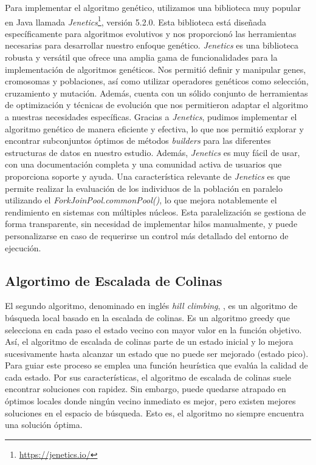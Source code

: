 Para implementar el algoritmo genético, utilizamos una biblioteca muy popular en Java llamada \emph{Jenetics}\footnote{\url{https://jenetics.io/}}, versión 5.2.0. Esta biblioteca está diseñada específicamente para algoritmos evolutivos y nos proporcionó las herramientas necesarias para desarrollar nuestro enfoque genético.
\emph{Jenetics} es una biblioteca robusta y versátil que ofrece una amplia gama de funcionalidades para la implementación de algoritmos genéticos. Nos permitió definir y manipular genes, cromosomas y poblaciones, así como utilizar operadores genéticos como selección, cruzamiento y mutación. Además, cuenta con un sólido conjunto de herramientas de optimización y técnicas de evolución que nos permitieron adaptar el algoritmo a nuestras necesidades específicas.
Gracias a \emph{Jenetics}, pudimos implementar el algoritmo genético de manera eficiente y efectiva, lo que nos permitió explorar y encontrar subconjuntos óptimos de métodos \emph{builders} para las diferentes estructuras de datos en nuestro estudio. Además, \emph{Jenetics} es muy fácil de usar, con una documentación completa y una comunidad activa de usuarios que proporciona soporte y ayuda.
Una característica relevante de \emph{Jenetics} es que permite realizar la evaluación de los individuos de la población en paralelo utilizando el \emph{ForkJoinPool.commonPool()}, lo que mejora notablemente el rendimiento en sistemas con múltiples núcleos. Esta paralelización se gestiona de forma transparente, sin necesidad de implementar hilos manualmente, y puede personalizarse en caso de requerirse un control más detallado del entorno de ejecución.


\subsection{Algortimo de Escalada de Colinas}
\label{alg:approachHC}

El segundo algoritmo, denominado en inglés \textit{hill climbing},
\cite{Russell:2009, Cormen2009, kleinberg2006}, es un algoritmo de búsqueda local basado en la escalada de colinas.
Es un algoritmo greedy que selecciona en cada paso el estado vecino con mayor
valor en la función objetivo. 
Así, el algoritmo de escalada de colinas parte de un estado inicial y lo mejora sucesivamente hasta alcanzar un estado que no puede ser mejorado (estado pico). 
Para guiar este proceso se emplea una función heurística que evalúa la calidad de cada estado.
Por sus características, el algoritmo de escalada de colinas suele encontrar soluciones
con rapidez. Sin embargo, puede quedarse atrapado en óptimos locales donde
ningún vecino inmediato es mejor, pero existen mejores soluciones en el espacio
de búsqueda. Esto es, el algoritmo no siempre encuentra una solución óptima.

